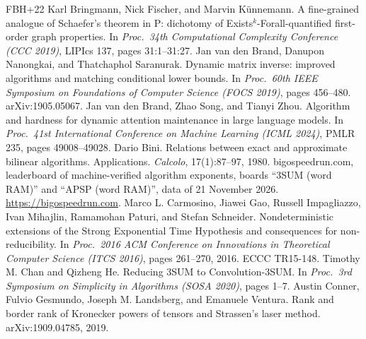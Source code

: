 \documentclass[11pt]{article}
\theoremstyle{definition}
\theoremstyle{remark}
\begin{document}
{\begin{thebibliography}{FBH{+}22}
 Karl Bringmann, Nick Fischer, and Marvin Künnemann. A fine-grained analogue of Schaefer's theorem in P: dichotomy of Exists$^k$-Forall-quantified first-order graph properties. In \emph{Proc.\ 34th Computational Complexity Conference (CCC 2019)}, LIPIcs 137, pages 31:1--31:27.
 Jan van den Brand, Danupon Nanongkai, and Thatchaphol Saranurak. Dynamic matrix inverse: improved algorithms and matching conditional lower bounds. In \emph{Proc.\ 60th IEEE Symposium on Foundations of Computer Science (FOCS 2019)}, pages 456--480. arXiv:1905.05067.
 Jan van den Brand, Zhao Song, and Tianyi Zhou. Algorithm and hardness for dynamic attention maintenance in large language models. In \emph{Proc.\ 41st International Conference on Machine Learning (ICML 2024)}, PMLR 235, pages 49008--49028.
 Dario Bini. Relations between exact and approximate bilinear algorithms. Applications. \emph{Calcolo}, 17(1):87--97, 1980.
 bigospeedrun.com, leaderboard of machine-verified algorithm exponents, boards ``3SUM (word RAM)'' and ``APSP (word RAM)'', data of 21 November 2026. \url{https://bigospeedrun.com}.
 Marco L. Carmosino, Jiawei Gao, Russell Impagliazzo, Ivan Mihajlin, Ramamohan Paturi, and Stefan Schneider. Nondeterministic extensions of the Strong Exponential Time Hypothesis and consequences for non-reducibility. In \emph{Proc.\ 2016 ACM Conference on Innovations in Theoretical Computer Science (ITCS 2016)}, pages 261--270, 2016. ECCC TR15-148.
 Timothy M. Chan and Qizheng He. Reducing 3SUM to Convolution-3SUM. In \emph{Proc.\ 3rd Symposium on Simplicity in Algorithms (SOSA 2020)}, pages 1--7.
 Austin Conner, Fulvio Gesmundo, Joseph M. Landsberg, and Emanuele Ventura. Rank and border rank of Kronecker powers of tensors and Strassen's laser method. arXiv:1909.04785, 2019.


\end{thebibliography}}
\end{document}
